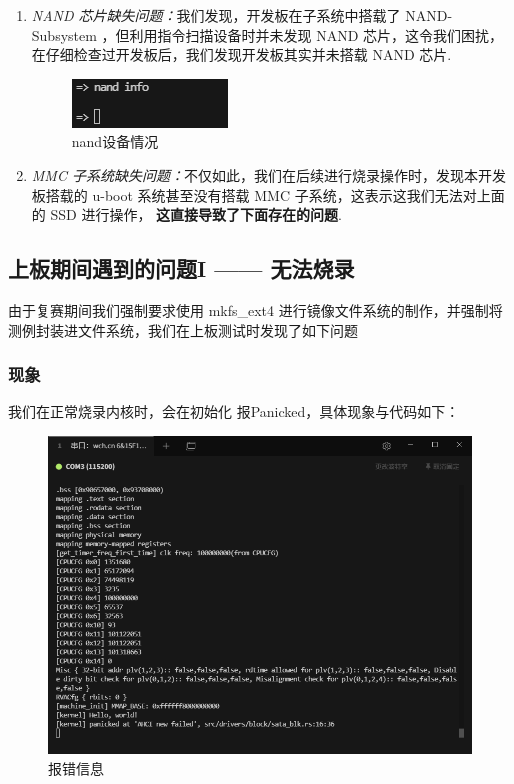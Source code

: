 \begin{enumerate}
	\item \textit{NAND 芯片缺失问题：}我们发现，开发板在子系统中搭载了 NAND-Subsystem ，但利用指令扫描设备时并未发现 NAND 芯片，这令我们困扰，在仔细检查过开发板后，我们发现开发板其实并未搭载 NAND 芯片.
		  \begin{figure}[htbp]
			\centering
			\includegraphics[width=0.5\linewidth]{figs/nand设备情况.png}
			\caption{nand设备情况}
			\label{nand设备情况}
		  \end{figure}
	\item \textit{MMC 子系统缺失问题：}不仅如此，我们在后续进行烧录操作时，发现本开发板搭载的 u-boot 系统甚至没有搭载 MMC 子系统，这表示这我们无法对上面的 SSD 进行操作， \textbf{这直接导致了下面存在的问题}.
\end{enumerate}

\subsection{上板期间遇到的问题I —— 无法烧录}

由于复赛期间我们强制要求使用 mkfs_ext4 进行镜像文件系统的制作，并强制将测例封装进文件系统，我们在上板测试时发现了如下问题

\subsubsection{现象}

我们在正常烧录内核时，会在初始化  报Panicked，具体现象与代码如下：

\begin{figure}[htbp]
	\centering
	\includegraphics[width=0.5\linewidth]{figs/bug.png}
	\caption{报错信息}
	\label{information of bug}
\end{figure}

